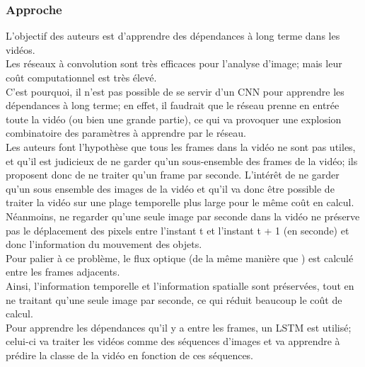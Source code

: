 \documentclass[11pt]{article}
\begin{document}
\subsubsection{Approche}
\label{sec:org9e3423f}
L'objectif des auteurs est d'apprendre des dépendances à long terme dans les vidéos.\\
Les réseaux à convolution sont très efficaces pour l'analyse d'image; mais leur coût computationnel est très élevé.\\
C'est pourquoi, il n'est pas possible de se servir d'un CNN pour apprendre les dépendances à long terme; en effet, il faudrait que le réseau prenne en entrée toute la vidéo (ou bien une grande partie), ce qui va provoquer une explosion combinatoire des paramètres à apprendre par le réseau.\\
Les auteurs font l'hypothèse que tous les frames dans la vidéo ne sont pas utiles, et qu'il est judicieux de ne garder qu'un sous-ensemble des frames de la vidéo; ils proposent donc de ne traiter qu'un frame par seconde. L'intérêt de ne garder qu'un sous ensemble des images de la vidéo et qu'il va donc être possible de traiter la vidéo sur une plage temporelle plus large pour le même coût en calcul.\\
Néanmoins, ne regarder qu'une seule image par seconde dans la vidéo ne préserve pas le déplacement des pixels entre l'instant t et l'instant t + 1 (en seconde) et donc l'information du mouvement des objets.\\
Pour palier à ce problème, le flux optique (de la même manière que \cite{DBLP:journals/corr/SimonyanZ14}) est calculé entre les frames adjacents.\\
Ainsi, l'information temporelle et l'information spatialle sont préservées, tout en ne traitant qu'une seule image par seconde, ce qui réduit beaucoup le coût de calcul.\\
Pour apprendre les dépendances qu'il y a entre les frames, un LSTM est utilisé; celui-ci va traiter les vidéos comme des séquences d'images et va apprendre à prédire la classe de la vidéo en fonction de ces séquences.\\
\end{document}

